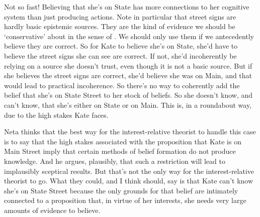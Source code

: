 \documentclass[oneside]{book}
\begin{document}
Not so fast! Believing that she's on State has more connections to her cognitive system than just producing actions. Note in particular that street signs are hardly basic epistemic sources. They are the kind of evidence we should be `conservative' about in the sense of \cite{Pryor2004-PRYWWW}. We should only use them if we antecedently believe they are correct. So for Kate to believe she's on State, she'd have to believe the street signs she can see are correct. If not, she'd incoherently be relying on a source she doesn't trust, even though it is not a basic source. But if she believes the street signs are correct, she'd believe she was on Main, and that would lead to practical incoherence. So there's no way to coherently add the belief that she's on State Street to her stock of beliefs. So she doesn't know, and can't know, that she's either on State or on Main. This is, in a roundabout way, due to the high stakes Kate faces.


Neta thinks that the best way for the interest-relative theorist to handle this case is to say that the high stakes associated with the proposition that Kate is on Main Street imply that certain methods of belief formation do not produce knowledge. And he argues, plausibly, that such a restriction will lead to implausibly sceptical results. But that's not the only way for the interest-relative theorist to go. What they could, and I think should, say is that Kate can't know she's on State Street because the only grounds for that belief are intimately connected to a proposition that, in virtue of her interests, she needs very large amounts of evidence to believe.
\end{document}
